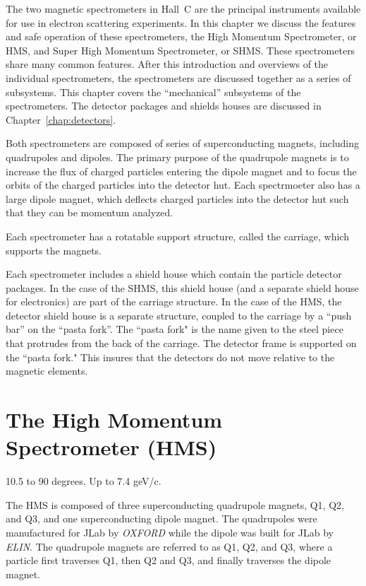 

	The two magnetic spectrometers in Hall~C are the principal instruments
available for use in electron scattering experiments. In this chapter
we discuss the features and safe operation of these
spectrometers,
the High Momentum Spectrometer, or HMS,
and Super High Momentum Spectrometer, or SHMS.  These spectrometers
share many common features.  After this
introduction and overviews of the individual spectrometers, the
spectrometers are discussed together as a series of subsystems.
This chapter covers the ``mechanical'' subsystems of the spectrometers.
The detector packages and
shields houses are discussed in Chapter~\ref{chap:detectors}.

Both spectrometers are composed of series of superconducting magnets,
including quadrupoles and dipoles.  
The primary purpose of the quadrupole magnets is to increase the flux of
charged particles entering the dipole magnet and to focus the orbits of the
charged particles into the detector hut.
Each spectrmoeter also has a large dipole magnet, which deflects
charged particles
into the detector hut 
such that they can be momentum
analyzed.

Each spectrometer has a rotatable support structure, called the
carriage, which supports the magnets.

Each spectrometer includes a shield house which contain the particle
detector packages.  In the case of the SHMS, this shield house (and a separate
shield house for electronics) are part of the carriage structure.  In
the case of the HMS, the detector shield house is a separate
structure, coupled to the carriage by a ``push bar'' on the ``pasta fork''.
The ``pasta fork" is the name given to the steel piece that protrudes
from the back of the carriage. The detector frame is supported on the
``pasta fork." This insures that the detectors do not move relative
to the magnetic elements.

\section{The High Momentum Spectrometer (HMS) }

10.5 to 90 degrees.  Up to 7.4 geV/c.  

The HMS is composed of three superconducting quadrupole magnets,
Q1, Q2, and Q3, and one superconducting dipole magnet. The quadrupoles
were manufactured for JLab by {\em OXFORD} while the dipole was built for 
JLab by {\em ELIN}.
The quadrupole magnets are referred to as Q1, Q2, and Q3, where a particle first traverses 
Q1, then Q2 and Q3, and finally traverses the dipole magnet.

